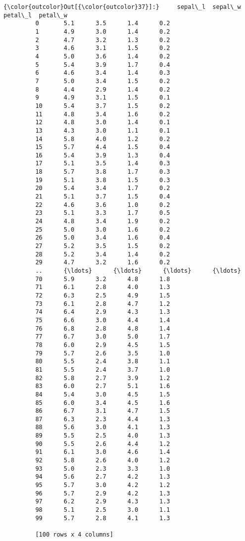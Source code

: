 \documentclass[11pt]{article}
\begin{document}
\begin{Verbatim}[commandchars=\\\{\}]
{\color{outcolor}Out[{\color{outcolor}37}]:}     sepal\_l  sepal\_w  petal\_l  petal\_w
         0       5.1      3.5      1.4      0.2
         1       4.9      3.0      1.4      0.2
         2       4.7      3.2      1.3      0.2
         3       4.6      3.1      1.5      0.2
         4       5.0      3.6      1.4      0.2
         5       5.4      3.9      1.7      0.4
         6       4.6      3.4      1.4      0.3
         7       5.0      3.4      1.5      0.2
         8       4.4      2.9      1.4      0.2
         9       4.9      3.1      1.5      0.1
         10      5.4      3.7      1.5      0.2
         11      4.8      3.4      1.6      0.2
         12      4.8      3.0      1.4      0.1
         13      4.3      3.0      1.1      0.1
         14      5.8      4.0      1.2      0.2
         15      5.7      4.4      1.5      0.4
         16      5.4      3.9      1.3      0.4
         17      5.1      3.5      1.4      0.3
         18      5.7      3.8      1.7      0.3
         19      5.1      3.8      1.5      0.3
         20      5.4      3.4      1.7      0.2
         21      5.1      3.7      1.5      0.4
         22      4.6      3.6      1.0      0.2
         23      5.1      3.3      1.7      0.5
         24      4.8      3.4      1.9      0.2
         25      5.0      3.0      1.6      0.2
         26      5.0      3.4      1.6      0.4
         27      5.2      3.5      1.5      0.2
         28      5.2      3.4      1.4      0.2
         29      4.7      3.2      1.6      0.2
         ..      {\ldots}      {\ldots}      {\ldots}      {\ldots}
         70      5.9      3.2      4.8      1.8
         71      6.1      2.8      4.0      1.3
         72      6.3      2.5      4.9      1.5
         73      6.1      2.8      4.7      1.2
         74      6.4      2.9      4.3      1.3
         75      6.6      3.0      4.4      1.4
         76      6.8      2.8      4.8      1.4
         77      6.7      3.0      5.0      1.7
         78      6.0      2.9      4.5      1.5
         79      5.7      2.6      3.5      1.0
         80      5.5      2.4      3.8      1.1
         81      5.5      2.4      3.7      1.0
         82      5.8      2.7      3.9      1.2
         83      6.0      2.7      5.1      1.6
         84      5.4      3.0      4.5      1.5
         85      6.0      3.4      4.5      1.6
         86      6.7      3.1      4.7      1.5
         87      6.3      2.3      4.4      1.3
         88      5.6      3.0      4.1      1.3
         89      5.5      2.5      4.0      1.3
         90      5.5      2.6      4.4      1.2
         91      6.1      3.0      4.6      1.4
         92      5.8      2.6      4.0      1.2
         93      5.0      2.3      3.3      1.0
         94      5.6      2.7      4.2      1.3
         95      5.7      3.0      4.2      1.2
         96      5.7      2.9      4.2      1.3
         97      6.2      2.9      4.3      1.3
         98      5.1      2.5      3.0      1.1
         99      5.7      2.8      4.1      1.3
         
         [100 rows x 4 columns]
\end{Verbatim}
            
\end{document}
